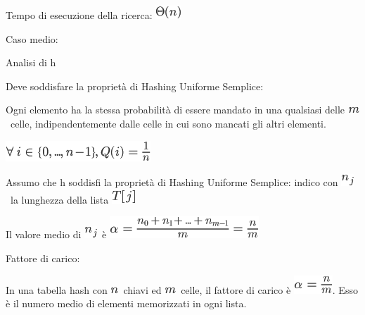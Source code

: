 \documentclass{article}
\begin{document}
{Tempo di esecuzione della ricerca:
}\includegraphics{images/image120.png}

{Caso medio:}

{Analisi di h}

{Deve soddisfare la proprietà di }{Hashing Uniforme Semplice:}

{Ogni elemento ha la stessa probabilità di essere mandato in una
qualsiasi delle }\includegraphics{images/image235.png}{~celle,
indipendentemente dalle celle in cui sono mancati gli altri elementi.}

\includegraphics{images/image242.png}

{}

{Assumo che h soddisfi la proprietà di Hashing Uniforme Semplice: indico
con }\includegraphics{images/image243.png}{~la lunghezza della lista
}\includegraphics{images/image244.png}

{}

{Il valore medio di }\includegraphics{images/image243.png}{~è
}\includegraphics{images/image245.png}

{}

{Fattore di carico: }

{In una tabella hash con }\includegraphics{images/image41.png}{~chiavi
ed }\includegraphics{images/image235.png}{~celle, il fattore di carico è
}\includegraphics{images/image246.png}{. Esso è il numero medio di
elementi memorizzati in ogni lista.}
\end{document}
